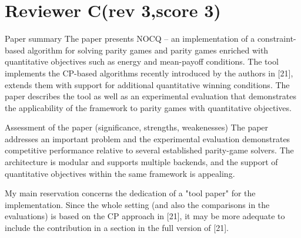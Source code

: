 
\section{Reviewer C(rev 3,score 3)}\label{rev:C}
\begin{reviewer}
Paper summary
The paper presents NOCQ -- an implementation of a constraint-based algorithm for solving parity games and parity games enriched with quantitative objectives such as energy and mean-payoff conditions. The tool implements the CP-based algorithms recently introduced by the authors in [21], extends them with support for additional quantitative winning conditions. The paper describes the tool as well as an experimental evaluation that demonstrates the applicability of the framework to parity games with quantitative objectives.

Assessment of the paper (significance, strengths, weakenesses)
The paper addresses an important problem and the experimental evaluation demonstrates competitive performance relative to several established parity-game solvers. The architecture is modular and supports multiple backends, and the support of quantitative objectives within the same framework is appealing.

My main reservation concerns the dedication of a "tool paper" for the implementation. Since the whole setting (and also the comparisons in the evaluations) is based on the CP approach in [21], it may be more adequate to include the contribution in a section in the full version of [21].
\end{reviewer}


